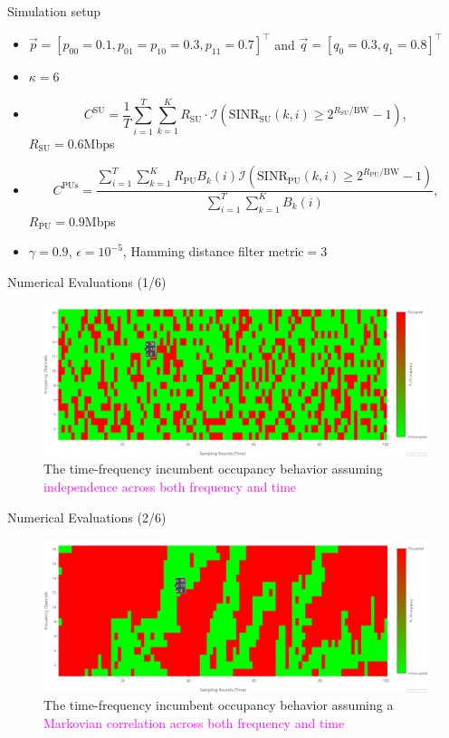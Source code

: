 \documentclass{beamer}
\begin{document}
\begin{frame}{Simulation setup}
   \footnotesize{\begin{itemize}
        \item $\vec{p}{=}[p_{00}{=}0.1,p_{01}{=}p_{10}{=}0.3,p_{11}{=}0.7]^\intercal$ and $\vec{q}{=}[q_{0}{=}0.3,q_{1}{=}0.8]^\intercal$
        \item $\kappa{=}6$
        \item 
        $$C^{\text{SU}} = \frac{1}{T}\sum_{i=1}^T \sum_{k=1}^{K} R_{\text{SU}} \cdot \mathcal{I}\left(\text{SINR}_{\text{SU}}(k,i) \geq 2^{R_{\text{SU}}/\text{BW}} - 1\right),$$ $R_{\text{SU}}{=}0.6$Mbps
        \item
        $$C^{\text{PUs}}{=}\frac{\sum_{i=1}^{T}\sum_{k=1}^{K}R_{\text{PU}}B_{k}(i)\mathcal{I}\left(\text{SINR}_{\text{PU}}(k,i){\geq}2^{R_{\text{PU}}/\text{BW}}{-}1\right)}{\sum_{i=1}^T\sum_{k=1}^{K}B_{k}(i)},$$
        $R_{\text{PU}}{=}0.9$Mbps
        \item $\gamma{=}0.9$, $\epsilon{=}10^{-5}$, Hamming distance filter metric${=}3$
    \end{itemize}}
\end{frame}
\begin{frame}{Numerical Evaluations (1/6)}
    \begin{figure}
    \centering
    \includegraphics[width = 1.0\textwidth]{Independence_1.PNG}
    \caption{The time-frequency incumbent occupancy behavior assuming \textcolor{magenta}{independence across both frequency and time}}
    \label{fig:29}
\end{figure}
\end{frame}
\begin{frame}{Numerical Evaluations (2/6)}
    \begin{figure}
    \centering
    \includegraphics[width = 1.0\textwidth]{Space_Time_Corr_1.PNG}
    \caption{The time-frequency incumbent occupancy behavior assuming a \textcolor{magenta}{Markovian correlation across both frequency and time}}
    \label{fig:30}
\end{figure}
\end{frame}
\end{document}
